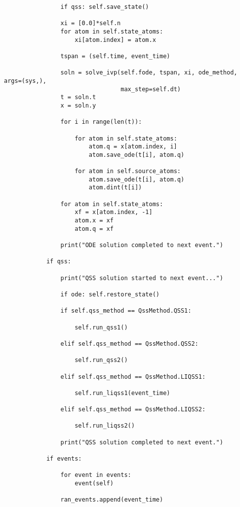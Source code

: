 \begin{lstlisting}
                if qss: self.save_state()

                xi = [0.0]*self.n
                for atom in self.state_atoms:
                    xi[atom.index] = atom.x

                tspan = (self.time, event_time)

                soln = solve_ivp(self.fode, tspan, xi, ode_method, args=(sys,),
                                 max_step=self.dt)
                t = soln.t
                x = soln.y

                for i in range(len(t)):

                    for atom in self.state_atoms:
                        atom.q = x[atom.index, i]
                        atom.save_ode(t[i], atom.q)

                    for atom in self.source_atoms:
                        atom.save_ode(t[i], atom.q)
                        atom.dint(t[i])

                for atom in self.state_atoms:
                    xf = x[atom.index, -1]
                    atom.x = xf
                    atom.q = xf

                print("ODE solution completed to next event.")

            if qss:

                print("QSS solution started to next event...")

                if ode: self.restore_state()

                if self.qss_method == QssMethod.QSS1:

                    self.run_qss1()

                elif self.qss_method == QssMethod.QSS2:

                    self.run_qss2()

                elif self.qss_method == QssMethod.LIQSS1:

                    self.run_liqss1(event_time)

                elif self.qss_method == QssMethod.LIQSS2:

                    self.run_liqss2()

                print("QSS solution completed to next event.")

            if events:

                for event in events:
                    event(self)

                ran_events.append(event_time)


\end{lstlisting}

